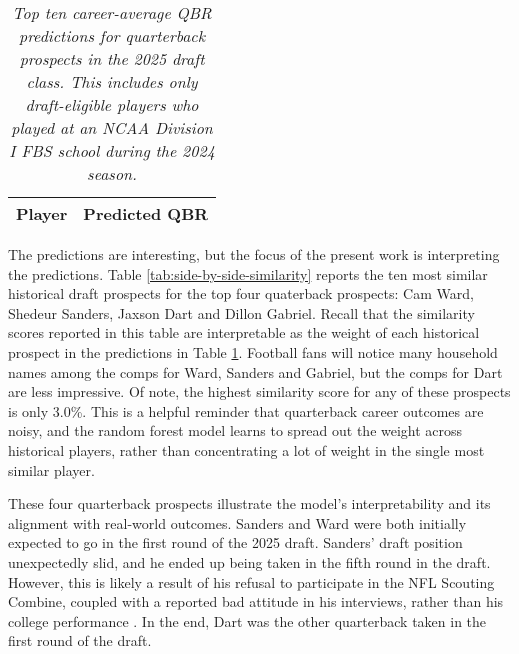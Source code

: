 \documentclass{article}
\begin{document}
\begin{table}[H]
  \centering
  \begin{tabular}{l|r}
    Player & Predicted QBR\\
    \hline
    
  \end{tabular}
  \caption{\textit{Top ten career-average QBR predictions for quarterback prospects in the 2025 draft class. This includes only draft-eligible players who played at an NCAA Division I FBS school during the 2024 season.}}
  \label{tab:top-ten}
\end{table}

The predictions are interesting, but the focus of the present work is interpreting the predictions. Table \ref{tab:side-by-side-similarity} reports the ten most similar historical draft prospects for the top four quaterback prospects: Cam Ward, Shedeur Sanders, Jaxson Dart and Dillon Gabriel. Recall that the similarity scores reported in this table are interpretable as the weight of each historical prospect in the predictions in Table \ref{tab:top-ten}. Football fans will notice many household names among the comps for Ward, Sanders and Gabriel, but the comps for Dart are less impressive. Of note, the highest similarity score for any of these prospects is only 3.0\%. This is a helpful reminder that quarterback career outcomes are noisy, and the random forest model learns to spread out the weight across historical players, rather than concentrating a lot of weight in the single most similar player.

These four quarterback prospects illustrate the model's interpretability and its alignment with real-world outcomes. Sanders and Ward were both initially expected to go in the first round of the 2025 draft. Sanders' draft position unexpectedly slid, and he ended up being taken in the fifth round in the draft. However, this is likely a result of his refusal to participate in the NFL Scouting Combine, coupled with a reported bad attitude in his interviews, rather than his college performance \citep{mckenna_what_nodate}. In the end, Dart was the other quarterback taken in the first round of the draft.

\begin{table}[H]
  \caption{\textit{Top ten similarity scores for each of the top four quarterback prospects in the 2025 NFL draft. The similarity score is the contribution made by each historical prospect to the weighted average which constitutes the reference prospect's prediction in the random forest model.}}
  \label{tab:side-by-side-similarity}
\end{table}
\end{document}
